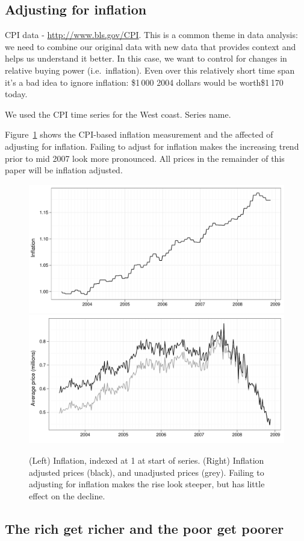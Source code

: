 \documentclass[oneside]{article}
\begin{document}
\subsection{Adjusting for inflation}

CPI data - \url{http://www.bls.gov/CPI}.  This is a common theme in data analysis: we need to combine our original data with new data that provides context and helps us understand it better.  In this case, we want to control for changes in relative buying power (i.e.\ inflation).  Even over this relatively short time span it's a bad idea to ignore inflation: \$1\,000 2004 dollars would be worth\$1\,170 today.

We used the CPI time series for the West coast.  Series name.

Figure~\ref{fig:inflation} shows the CPI-based inflation measurement and the affected of adjusting for inflation.  Failing to adjust for inflation makes the increasing trend prior to mid 2007 look more pronounced.  All prices in the remainder of this paper will be inflation adjusted.

\begin{figure}[htbp]
  \centering
    \includegraphics[width=0.5 \linewidth]{daily-cpi}%
    \includegraphics[width=0.5 \linewidth]{daily-price-adj}
  \caption{(Left) Inflation, indexed at 1 at start of series.  (Right) Inflation adjusted prices (black), and unadjusted prices (grey).  Failing to adjusting for inflation makes the rise look steeper, but has little effect on the decline.}
  \label{fig:inflation}
\end{figure}

\subsection{The rich get richer and the poor get poorer}
\end{document}
